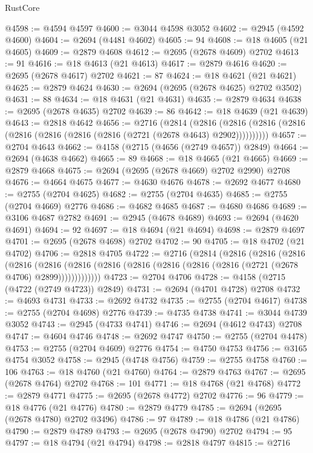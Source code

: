 \begin{lexlean}{RustCore}
\begin{coremodule}
@4598 := @4594 @4597
@4600 := @3044 @4598 @3052
@4602 := @2945 (@4592 @4600)
@4604 := @2694 (@4481 @4602)
@4605 := 94
@4608 := @18 @4605 (@21 @4605)
@4609 := @2879 @4608
@4612 := @2695 (@2678 @4609) @2702
@4613 := 91
@4616 := @18 @4613 (@21 @4613)
@4617 := @2879 @4616
@4620 := @2695 (@2678 @4617) @2702
@4621 := 87
@4624 := @18 @4621 (@21 @4621)
@4625 := @2879 @4624
@4630 := @2694 (@2695 (@2678 @4625) @2702 @3502)
@4631 := 88
@4634 := @18 @4631 (@21 @4631)
@4635 := @2879 @4634
@4638 := @2695 (@2678 @4635) @2702
@4639 := 86
@4642 := @18 @4639 (@21 @4639)
@4643 := @2818 @4642
@4656 := @2716
    (@2814
      (@2816 (@2816 (@2816 (@2816 (@2816 (@2816 (@2816 (@2816 (@2721 (@2678 @4643) @2902))))))))))
@4657 := @2704 @4643
@4662 := @4158 (@2715 (@4656 (@2749 @4657)) @2849)
@4664 := @2694 (@4638 @4662)
@4665 := 89
@4668 := @18 @4665 (@21 @4665)
@4669 := @2879 @4668
@4675 := @2694 (@2695 (@2678 @4669) @2702 @2990) @2708
@4676 := @4664 @4675
@4677 := @4630 @4676
@4678 := @2692 @4677
@4680 := @2755 (@2704 @4625)
@4682 := @2755 (@2704 @4635)
@4685 := @2755 (@2704 @4669) @2776
@4686 := @4682 @4685
@4687 := @4680 @4686
@4689 := @3106 @4687 @2782
@4691 := @2945 (@4678 @4689)
@4693 := @2694 (@4620 @4691)
@4694 := 92
@4697 := @18 @4694 (@21 @4694)
@4698 := @2879 @4697
@4701 := @2695 (@2678 @4698) @2702
@4702 := 90
@4705 := @18 @4702 (@21 @4702)
@4706 := @2818 @4705
@4722 := @2716
    (@2814
      (@2816
        (@2816
          (@2816
            (@2816
              (@2816
                (@2816 (@2816 (@2816 (@2816 (@2816 (@2816 (@2721 (@2678 @4706) @2899)))))))))))))
@4723 := @2704 @4706
@4728 := @4158 (@2715 (@4722 (@2749 @4723)) @2849)
@4731 := @2694 (@4701 @4728) @2708
@4732 := @4693 @4731
@4733 := @2692 @4732
@4735 := @2755 (@2704 @4617)
@4738 := @2755 (@2704 @4698) @2776
@4739 := @4735 @4738
@4741 := @3044 @4739 @3052
@4743 := @2945 (@4733 @4741)
@4746 := @2694 (@4612 @4743) @2708
@4747 := @4604 @4746
@4748 := @2692 @4747
@4750 := @2755 (@2704 @4478)
@4753 := @2755 (@2704 @4609) @2776
@4754 := @4750 @4753
@4756 := @3165 @4754 @3052
@4758 := @2945 (@4748 @4756)
@4759 := @2755 @4758
@4760 := 106
@4763 := @18 @4760 (@21 @4760)
@4764 := @2879 @4763
@4767 := @2695 (@2678 @4764) @2702
@4768 := 101
@4771 := @18 @4768 (@21 @4768)
@4772 := @2879 @4771
@4775 := @2695 (@2678 @4772) @2702
@4776 := 96
@4779 := @18 @4776 (@21 @4776)
@4780 := @2879 @4779
@4785 := @2694 (@2695 (@2678 @4780) @2702 @3496)
@4786 := 97
@4789 := @18 @4786 (@21 @4786)
@4790 := @2879 @4789
@4793 := @2695 (@2678 @4790) @2702
@4794 := 95
@4797 := @18 @4794 (@21 @4794)
@4798 := @2818 @4797
@4815 := @2716

\end{coremodule}
\end{lexlean}
